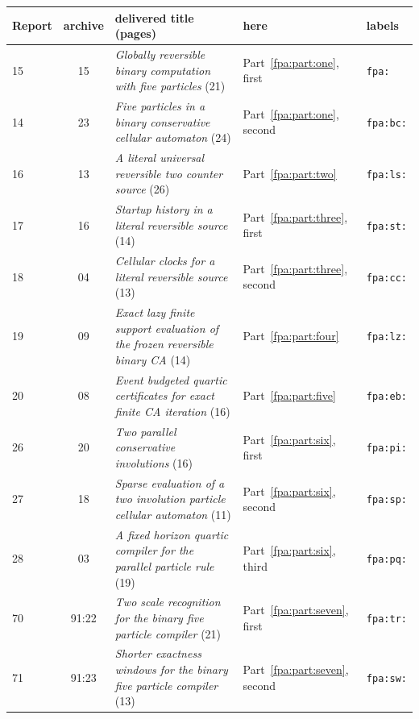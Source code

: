 \documentclass[11pt,a4paper]{article}
\numberwithin{equation}{section}
\begin{document}
\begin{center}
\small
\begin{tabular}{@{}lcp{}p{}l@{}}
\toprule
Report & archive & delivered title (pages) & here & labels\\
\midrule
15 & 15 & \emph{Globally reversible binary computation with five particles} (21) & Part~\ref{fpa:part:one}, first & \texttt{fpa:}\\
14 & 23 & \emph{Five particles in a binary conservative cellular automaton} (24) & Part~\ref{fpa:part:one}, second & \texttt{fpa:bc:}\\
16 & 13 & \emph{A literal universal reversible two counter source} (26) & Part~\ref{fpa:part:two} & \texttt{fpa:ls:}\\
17 & 16 & \emph{Startup history in a literal reversible source} (14) & Part~\ref{fpa:part:three}, first & \texttt{fpa:st:}\\
18 & 04 & \emph{Cellular clocks for a literal reversible source} (13) & Part~\ref{fpa:part:three}, second & \texttt{fpa:cc:}\\
19 & 09 & \emph{Exact lazy finite support evaluation of the frozen reversible binary CA} (14) & Part~\ref{fpa:part:four} & \texttt{fpa:lz:}\\
20 & 08 & \emph{Event budgeted quartic certificates for exact finite CA iteration} (16) & Part~\ref{fpa:part:five} & \texttt{fpa:eb:}\\
26 & 20 & \emph{Two parallel conservative involutions} (16) & Part~\ref{fpa:part:six}, first & \texttt{fpa:pi:}\\
27 & 18 & \emph{Sparse evaluation of a two involution particle cellular automaton} (11) & Part~\ref{fpa:part:six}, second & \texttt{fpa:sp:}\\
28 & 03 & \emph{A fixed horizon quartic compiler for the parallel particle rule} (19) & Part~\ref{fpa:part:six}, third & \texttt{fpa:pq:}\\
70 & 91:22 & \emph{Two scale recognition for the binary five particle compiler} (21) & Part~\ref{fpa:part:seven}, first & \texttt{fpa:tr:}\\
71 & 91:23 & \emph{Shorter exactness windows for the binary five particle compiler} (13) & Part~\ref{fpa:part:seven}, second & \texttt{fpa:sw:}\\
\bottomrule
\end{tabular}
\end{center}
\end{document}
